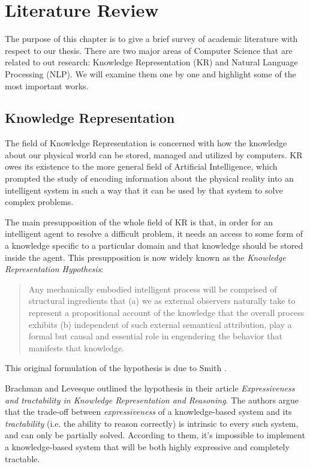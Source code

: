 \chapter{Literature Review}
\label{chap:lr}
The purpose of this chapter is to give a brief survey of academic literature with respect to our thesis.
There are two major areas of Computer Science that are related to out research: Knowledge Representation (KR) and Natural Language
Processing (NLP). We will examine them one by one and highlight some of the most important works.

\section{Knowledge Representation}
The field of Knowledge Representation is concerned with how the knowledge about our physical world can be stored, managed and
utilized by computers. KR owes its existence to the more general field of Artificial Intelligence, which prompted the study of
encoding information about the physical reality into an intelligent system in such a way that it can be used by that system to
solve complex problems.

The main presupposition of the whole field of KR is that, in order for an intelligent agent to resolve a difficult problem, it
needs an access to some form of a knowledge specific to a particular domain and that knowledge should be stored inside the agent.
This presupposition is now widely known as the \textit{Knowledge Representation Hypothesis}:
\begin{quote}
    Any mechanically embodied intelligent process will be comprised of structural ingredients that (a) we as external observers
    naturally take to represent a propositional account of the knowledge that the overall process exhibits (b) independent of such
    external semantical attribution, play a formal but causal and essential role in engendering the behavior that manifests that
    knowledge.
\end{quote}
This original formulation of the hypothesis is due to Smith \cite{smithyp}.

Brachman and Levesque outlined the hypothesis in their article \textit{Expressiveness and tractability in Knowledge Representation
and Reasoning}\cite{krhyp}. The authors argue that the trade-off between \textit{expressiveness} of a knowledge-based system and
its \textit{tractability} (i.e. the ability to reason correctly) is intrinsic to every such system, and can only be partially
solved.  According to them, it's impossible to implement a knowledge-based system that will be both highly expressive and
completely tractable.

